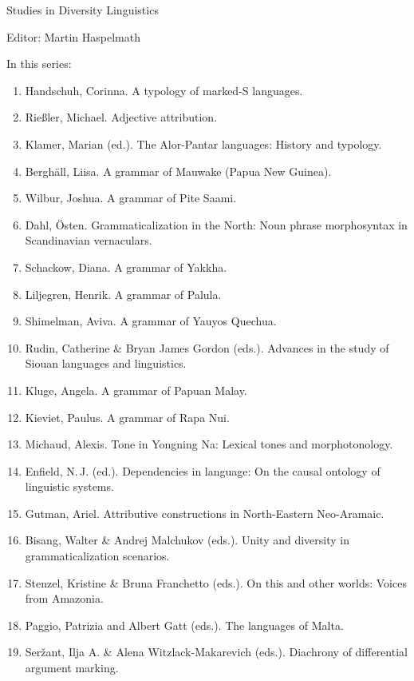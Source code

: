 {\large Studies in Diversity Linguistics}

\bigskip

Editor: Martin Haspelmath


\bigskip
In this series:





\begin{multicols}{2}
\footnotesize

\begin{enumerate}
\item Handschuh, Corinna. A typology of marked-S languages.
\item Rießler, Michael. Adjective attribution.
\item Klamer, Marian (ed.). The Alor-Pantar languages: History and typology.
\item Berghäll, Liisa. A grammar of Mauwake (Papua New Guinea).
\item Wilbur, Joshua. A grammar of Pite Saami.
\item Dahl, Östen. Grammaticalization in the North: Noun phrase morphosyntax in Scandinavian vernaculars.
\item Schackow, Diana.    A grammar of Yakkha.
\item Liljegren, Henrik. A grammar of Palula.
\item Shimelman, Aviva. A grammar of Yauyos Quechua.
\item Rudin, Catherine \& Bryan James Gordon (eds.). Advances in the study of Siouan languages and linguistics.
\item Kluge, Angela. A grammar of Papuan Malay.
\item Kieviet, Paulus. A grammar of Rapa Nui.
\item Michaud, Alexis. Tone in Yongning Na: Lexical tones and morphotonology.
\item Enfield, N.\,J. (ed.).  Dependencies in language: On the causal ontology of linguistic systems.
\item Gutman, Ariel. Attributive constructions in North-Eastern Neo-Aramaic.
\item Bisang, Walter \& Andrej Malchukov (eds.). Unity and diversity in grammaticalization scenarios.
\item Stenzel, Kristine \& Bruna Franchetto (eds.). On this and other worlds: Voices from Amazonia.
\item Paggio, Patrizia and Albert Gatt (eds.). The languages of Malta.
\item Seržant, Ilja A.  \& Alena Witzlack-Makarevich (eds.). Diachrony of differential argument marking.

\end{enumerate}
\end{multicols}
